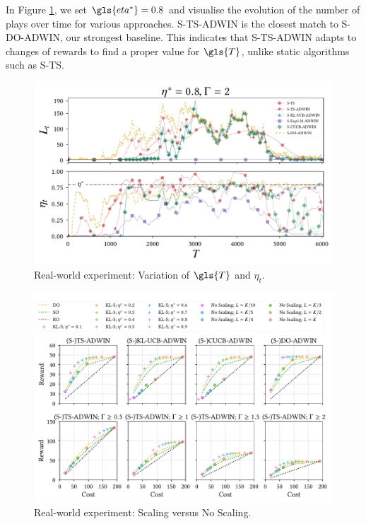 In Figure \ref{real_world_experiment_Lt}, we set $\gls{eta^*} = 0.8$ and visualise the evolution of the number of plays over time for various approaches. 
\gls{S-TS-ADWIN} is the closest match to S-\gls{DO}-\gls{ADWIN}, our strongest baseline. This indicates that \gls{S-TS-ADWIN} adapts to changes of rewards to find a proper value for ${\gls{T}}$, unlike static algorithms such as \gls{S-TS}.

\begin{figure}
	\begin{center}
		\includegraphics[width=1.0\linewidth]{part3-figures/Lt_etat-2-compressed.pdf}
	\end{center}
	\caption{Real-world experiment: Variation of ${\gls{T}}$ and $\eta_t$.} 
	\label{real_world_experiment_Lt}
\end{figure} 

\begin{figure}
	\centering
	\includegraphics[width=1.0\linewidth]{part3-figures/RealWorld_2_legend-2-compressed.pdf}
	\caption{Real-world experiment: Scaling versus No Scaling.}
	\label{real_world_utility}
\end{figure} 

